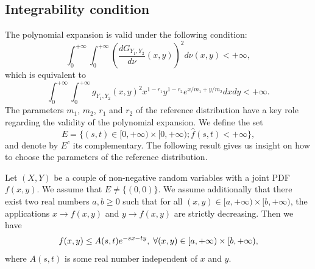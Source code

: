 \subsection{Integrability condition}
The polynomial expansion is valid under the following condition: 
\begin{equation}\label{Integrabilitycondition1}
\int_{0}^{+\infty}\int_{0}^{+\infty}\left(\frac{dG_{Y_{1},Y_{2}}}{d\nu}(x,y)\right)^{2}d\nu(x,y)<+\infty,
\end{equation}
which is equivalent to 
\begin{equation}\label{Integrabilitycondition2}
\int_{0}^{+\infty}\int_{0}^{+\infty}g_{Y_{1},Y_{2}}(x,y)^{2}x^{1-r_{1}}y^{1-r_{2}}e^{x/m_{1}+y/m_{2}}dxdy<+\infty.
\end{equation}
The parameters $m_{1}$, $m_{2}$, $r_{1}$ and $r_{2}$ of the reference distribution have a key role regarding the validity of the polynomial expansion. We define the set
\begin{equation}
E=\{(s,t)\in[0,+\infty)\times [0,+\infty) ; \widehat{f}(s,t)<+\infty\},
\end{equation}
and denote by $E^{c}$ its complementary. The following result gives us insight on how to choose the parameters of the reference distribution.
\begin{Theo}\label{IntegrabiltyConditionVersion2}
Let $(X,Y)$ be a couple of non-negative random variables with a joint PDF $f(x,y)$. We assume that $E\neq\{(0,0)\}$. We assume additionally that there exist two real numbers $a, b\geq0$ such that for all $(x,y)\in[a,+\infty) \times [b,+\infty)$, the applications $x\rightarrow f(x,y)$ and $y\rightarrow f(x,y)$ are strictly decreasing. Then we have 
\begin{equation}\label{FatInequality}
f(x,y)\leq A(s,t)e^{-sx-ty}, \hspace{0.1cm} \forall (x,y)\in[a,+\infty) \times [b,+\infty),
\end{equation} 
where $A(s,t)$ is some real number independent of $x$ and $y$.
\end{Theo}
